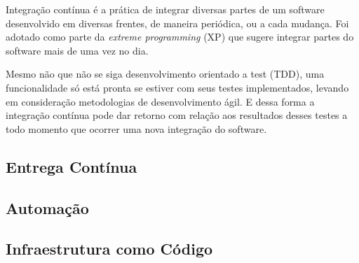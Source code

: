 Integração contínua é a prática de integrar diversas partes de um software desenvolvido em diversas frentes, de maneira periódica, ou a cada mudança. Foi adotado como parte da \textit{extreme programming} (XP) que sugere integrar partes do software mais de uma vez no dia.

Mesmo não que não se siga desenvolvimento orientado a test (TDD), uma funcionalidade só está pronta se estiver com seus testes implementados, levando em consideração metodologias de desenvolvimento ágil. E dessa forma a integração contínua pode dar retorno com relação aos resultados desses testes a todo momento que ocorrer uma nova integração do software.

\subsection{Entrega Contínua}

\subsection{Automação}

\subsection{Infraestrutura como Código}


